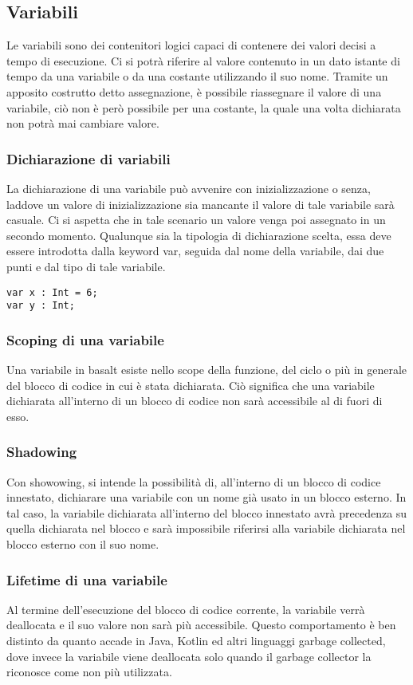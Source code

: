 \subsection{Variabili}
Le variabili sono dei contenitori logici capaci di contenere dei valori decisi a tempo di esecuzione. Ci si potrà riferire 
al valore contenuto in un dato istante di tempo da una variabile o da una costante utilizzando il suo nome. Tramite un apposito 
costrutto detto assegnazione, è possibile riassegnare il valore di una variabile, ciò non è però possibile per una costante, la quale 
una volta dichiarata non potrà mai cambiare valore. 

\subsubsection{Dichiarazione di variabili}
La dichiarazione di una variabile può avvenire con inizializzazione o senza, laddove un valore di inizializzazione sia mancante il valore 
di tale variabile sarà casuale. Ci si aspetta che in tale scenario un valore venga poi assegnato in un secondo momento. Qualunque sia la 
tipologia di dichiarazione scelta, essa deve essere introdotta dalla keyword var, seguida dal nome della variabile, dai due punti e dal tipo 
di tale variabile.

\vspace{0.5cm}

\begin{lstlisting}[frame=single]
var x : Int = 6;
var y : Int;
\end{lstlisting}

\subsubsection{Scoping di una variabile}
Una variabile in basalt esiste nello scope della funzione, del ciclo o più in generale del blocco di codice in cui è stata dichiarata. Ciò 
significa che una variabile dichiarata all’interno di un blocco di codice non sarà accessibile al di fuori di esso.

\subsubsection{Shadowing}
Con showowing, si intende la possibilità di, all'interno di un blocco di codice innestato, dichiarare una variabile con un nome già usato
in un blocco esterno. In tal caso, la variabile dichiarata all'interno del blocco innestato avrà precedenza su quella dichiarata nel blocco e 
sarà impossibile riferirsi alla variabile dichiarata nel blocco esterno con il suo nome.

\subsubsection{Lifetime di una variabile}
Al termine dell'esecuzione del blocco di codice corrente, la variabile verrà deallocata e il suo valore non sarà più accessibile. Questo comportamento
è ben distinto da quanto accade in Java, Kotlin ed altri linguaggi garbage collected, dove invece la variabile viene deallocata solo quando il garbage
collector la riconosce come non più utilizzata.

\vspace{0.5cm}